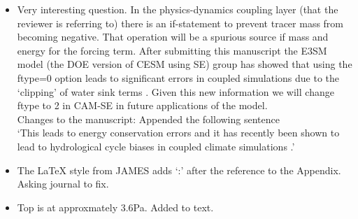 \documentclass[11pt]{article}
\begin{document}
\begin{itemize}
\item {\color{blue}{L545-550: Tracer concentrations need to be positive definite as outlined, which may require some sort of limiters. When water tracers are involved, such mechanisms, however, not only affect the tracer budgets, but generally also the energetics. Does CAM-SE relate tracer tendency limitations to the energetics? Or does ``setting to zero'' of a mixing ratio necessarily cause an energetic inconsistency? It would be valuable to have some explanation on this aspect.}}

Very interesting question. In the physics-dynamics coupling layer (that the reviewer is referring to) there is an if-statement to prevent tracer mass from becoming negative. That operation will be a spurious source if mass and energy for the forcing term. After submitting this manuscript the E3SM model (the DOE version of CESM using SE) group has showed that using the ftype=0 option leads to significant errors in coupled simulations due to the `clipping' of water sink terms \citep{water-leak}. Given this new information we will change ftype to 2 in CAM-SE in future applications of the model.\\

Changes to the manuscript: Appended the following sentence\\

`This leads to energy conservation errors and it has recently been shown to lead to hydrological cycle biases in coupled climate simulations \citep{water-leak}.'




\item {\color{blue}{L586: ... Appendix D. When ...}}

The LaTeX style from JAMES adds `:' after the reference to the Appendix. Asking journal to fix.

\item {\color{blue}{L701: Please specify the model top of the 32 level version used here.}}

Top is at approxmately 3.6Pa. Added to text.


\end{itemize}
\end{document}
